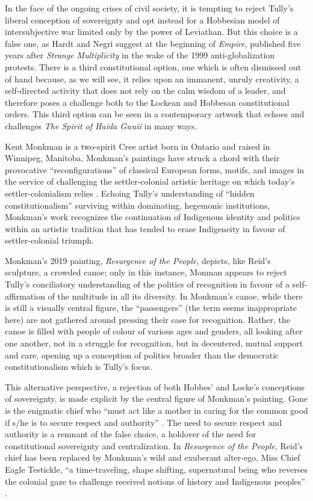 \documentclass[12pt,oneside]{memoir}
\begin{document}
In the face of the ongoing crises of civil society, it is tempting to reject Tully’s liberal conception of sovereignty and opt instead for a Hobbesian model of intersubjective war limited only by the power of Leviathan. But this choice is a false one, as Hardt and Negri suggest at the beginning of \emph{Empire}, published five years after \emph{Strange Multiplicity} in the wake of the 1999 anti-globalization protests. There is a third constitutional option, one which is often dismissed out of hand because, as we will see, it relies upon an immanent, unruly creativity, a self-directed activity that does not rely on the calm wisdom of a leader, and therefore poses a challenge both to the Lockean and Hobbesan constitutional orders. This third option can be seen in a contemporary artwork that echoes and challenges \emph{The Spirit of Haida Gwaii} in many ways.

Kent Monkman is a two-spirit Cree artist born in Ontario and raised in Winnipeg, Manitoba. Monkman’s paintings have struck a chord with their provocative “reconfigurations” of classical European forms, motifs, and images in the service of challenging the settler-colonial artistic heritage on which today’s settler-colonialism relies \citep{Elston2012}. Echoing Tully’s understanding of “hidden constitutionalism” surviving within dominating, hegemonic institutions, Monkman’s work recognizes the continuation of Indigenous identity and politics within an artistic tradition that has tended to erase Indigeneity in favour of settler-colonial triumph. 

Monkman’s 2019 painting, \emph{Resurgence of the People}, depicts, like Reid’s sculpture, a crowded canoe; only in this instance, Monman appears to reject Tully’s conciliatory understanding of the politics of recognition in favour of a self-affirmation of the multitude in all its diversity. In Monkman’s canoe, while there is still a visually central figure, the “passengers” (the term seems inappropriate here) are not gathered around pressing their case for recognition. Rather, the canoe is filled with people of colour of various ages and genders, all looking after one another, not in a struggle for recognition, but in decentered, mutual support and care, opening up a conception of politics broader than the democratic constitutionalism which is Tully’s focus. 

This alternative perspective, a rejection of both Hobbes’ and Locke’s conceptions of sovereignty, is made explicit by the central figure of Monkman’s painting. Gone is the enigmatic chief who “must act like a mother in caring for the common good if s/he is to secure respect and authority” \citep[25]{Tully1995}. The need to secure respect and authority is a remnant of the false choice, a holdover of the need for constitutional sovereignty and centralization. In \emph{Resurgence of the People}, Reid’s chief has been replaced by Monkman’s wild and exuberant alter-ego, Miss Chief Eagle Testickle, “a time-traveling, shape shifting, supernatural being who reverses the colonial gaze to challenge received notions of history and Indigenous peoples” \citep{MonkmanBiography}.
\end{document}
